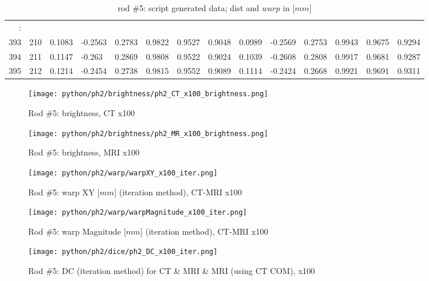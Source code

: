 \begin{table}[p]
{\begin{minipage}{\textheight}
\begin{tabular}{rr||lll|lll||lll|lll}
\hline
:      &      &         &         &        &        &        &        &         &         &        &        &        &        \\
393    & 210  & 0.1083  & -0.2563 & 0.2783 & 0.9822 & 0.9527 & 0.9048 & 0.0989  & -0.2569 & 0.2753 & 0.9943 & 0.9675 & 0.9294 \\
394    & 211  & 0.1147  & -0.263  & 0.2869 & 0.9808 & 0.9522 & 0.9024 & 0.1039  & -0.2608 & 0.2808 & 0.9917 & 0.9681 & 0.9287 \\
395    & 212  & 0.1214  & -0.2454 & 0.2738 & 0.9815 & 0.9552 & 0.9089 & 0.1114  & -0.2424 & 0.2668 & 0.9921 & 0.9691 & 0.9311
 \end{tabular}
        \caption{rod \#5: script generated data; dist and $warp$ in [$mm$]}
        \label{tab:spit-out-5}
      \end{minipage}
    }
  \end{table}

\begin{figure}[!tbh]
    \centering
    \texttt{[image: python/ph2/brightness/ph2\_CT\_x100\_brightness.png]}
    \caption{Rod \#5: brightness, CT x100}
    \label{fig:ph2_CT_x100_brightness}
\end{figure}

\begin{figure}[!tbh]
    \centering
    \texttt{[image: python/ph2/brightness/ph2\_MR\_x100\_brightness.png]}
    \caption{Rod \#5: brightness, MRI x100}
    \label{fig:ph2_MR_x100_brightness}
\end{figure}


\begin{figure}[!bth]
  \centering
  \texttt{[image: python/ph2/warp/warpXY\_x100\_iter.png]}
  \caption{Rod \#5: warp XY [$mm$] (iteration method), CT-MRI x100}
  \label{fig:ph2_warpXY_x100}
\end{figure}

\begin{figure}[!tbh]
    \centering
    \texttt{[image: python/ph2/warp/warpMagnitude\_x100\_iter.png]}
    \caption{Rod \#5: warp Magnitude [$mm$] (iteration method), CT-MRI x100}
    \label{fig:ph2_warpMagnitude_x100}
\end{figure}

\begin{figure}[!bth]
    \centering
    \texttt{[image: python/ph2/dice/ph2\_DC\_x100\_iter.png]}
    \caption{Rod \#5: DC (iteration method) for CT \& MRI \& MRI (using CT COM), x100}
    \label{fig:ph2_DC_x100}
\end{figure}


